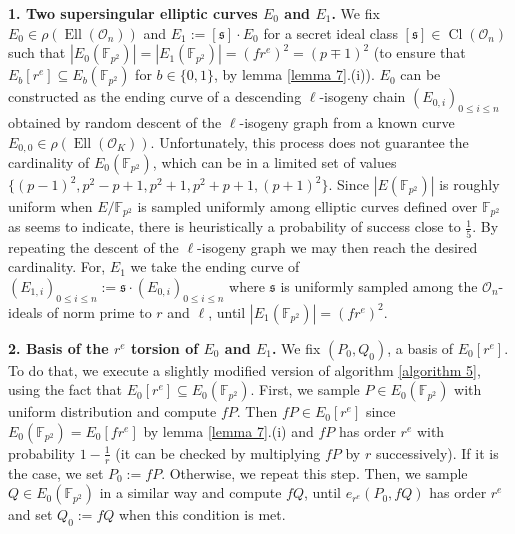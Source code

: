 \documentclass[a4paper,10pt]{report}
\theoremstyle{definition}
\theoremstyle{plain}
\theoremstyle{definition}
\newcommand{\F}{\mathbb{F}}
\newcommand{\mO}{\mathcal{O}}
\renewcommand{\(}{\left(}
\renewcommand{\)}{\right)}
\newcommand{\mf}[1]{\mathfrak{#1}}
\DeclareMathOperator{\Cl}{Cl}
\DeclareMathOperator{\Ell}{Ell}
\begin{document}
\textbf{1. Two supersingular elliptic curves $E_0$ and $E_1$.}
We fix $E_0\in\rho(\Ell(\mO_n))$ and $E_1:=[\mf{s}]\cdot E_0$ for a secret ideal class $[\mf{s}]\in\Cl(\mO_n)$ such that $|E_0(\F_{p^2})|=|E_1(\F_{p^2})|=(f r^e)^2=(p\mp 1)^2$ (to ensure that $E_b[r^e]\subseteq E_b(\F_{p^2})$ for $b\in\{0,1\}$, by lemma \ref{lemma 7}.(i)). $E_0$ can be constructed as the ending curve of a descending $\ell$-isogeny chain $(E_{0,i})_{0\leq i\leq n}$ obtained by random descent of the $\ell$-isogeny graph from a known curve $E_{0,0}\in\rho(\Ell(\mO_K))$.  Unfortunately, this process does not guarantee the cardinality of $E_0(\F_{p^2})$, which can be in a limited set of values $\{(p-1)^2,p^2-p+1,p^2+1,p^2+p+1,(p+1)^2\}$. Since $|E(\F_{p^2})|$ is roughly uniform when $E/\F_{p^2}$ is sampled uniformly among elliptic curves defined over $\F_{p^2}$ as \cite[theorem 1.1]{Howe} seems to indicate, there is heuristically a probability of success close to $\frac{1}{5}$. By repeating the descent of the $\ell$-isogeny graph we may then reach the desired cardinality.  For, $E_1$ we take the ending curve of $(E_{1,i})_{0\leq i\leq n}:=\mf{s}\cdot (E_{0,i})_{0\leq i\leq n}$ where $\mf{s}$ is uniformly sampled among the $\mO_n$-ideals of norm prime to $r$ and $\ell$, until $|E_1(\F_{p^2})|=(f r^e)^2$. 

\textbf{2. Basis of the $r^e$ torsion of $E_0$ and $E_1$.}
We fix $(P_0, Q_0)$, a basis of $E_0[r^e]$. To do that, we execute a slightly modified version of algorithm \ref{algorithm 5}, using the fact that $E_0[r^e]\subseteq E_0(\F_{p^2})$. First, we sample $P\in E_0(\F_{p^2})$ with uniform distribution and compute $fP$. Then $fP\in E_0[r^e]$ since $E_0(\F_{p^2})=E_0[fr^e]$ by lemma \ref{lemma 7}.(i) and $fP$ has order $r^e$ with probability $1-\frac{1}{r}$ (it can be checked by multiplying $fP$ by $r$ successively). If it is the case, we set $P_0:=fP$. Otherwise, we repeat this step. Then, we sample $Q\in E_0(\F_{p^2})$ in a similar way and compute $fQ$, until $e_{r^e}(P_0,fQ)$ has order $r^e$ and set $Q_0:=fQ$ when this condition is met.  
\end{document}
